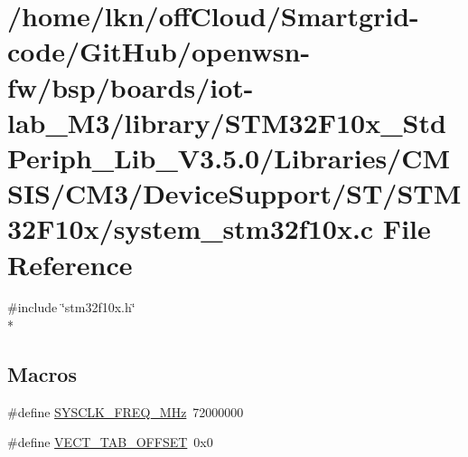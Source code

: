 \hypertarget{iot-lab___m3_2library_2_s_t_m32_f10x___std_periph___lib___v3_85_80_2_libraries_2_c_m_s_i_s_2_c_ma7903fbbb33ff1d89c70852ed1b1fe1b}{}\section{/home/lkn/off\+Cloud/\+Smartgrid-\/code/\+Git\+Hub/openwsn-\/fw/bsp/boards/iot-\/lab\+\_\+\+M3/library/\+S\+T\+M32\+F10x\+\_\+\+Std\+Periph\+\_\+\+Lib\+\_\+\+V3.5.0/\+Libraries/\+C\+M\+S\+I\+S/\+C\+M3/\+Device\+Support/\+S\+T/\+S\+T\+M32\+F10x/system\+\_\+stm32f10x.c File Reference}
\label{iot-lab___m3_2library_2_s_t_m32_f10x___std_periph___lib___v3_85_80_2_libraries_2_c_m_s_i_s_2_c_ma7903fbbb33ff1d89c70852ed1b1fe1b}
{\ttfamily \#include \char`\"{}stm32f10x.\+h\char`\"{}}\\*
\subsection*{Macros}
\begin{DoxyCompactItemize}
\item 
\#define \hyperlink{group___s_t_m32_f10x___system___private___defines_ga69649cc38f34627cfb48b51062ebd390}{S\+Y\+S\+C\+L\+K\+\_\+\+F\+R\+E\+Q\+\_\+M\+Hz}~72000000
\item 
\#define \hyperlink{group___s_t_m32_f10x___system___private___defines_ga40e1495541cbb4acbe3f1819bd87a9fe}{V\+E\+C\+T\+\_\+\+T\+A\+B\+\_\+\+O\+F\+F\+S\+ET}~0x0
\end{DoxyCompactItemize}
